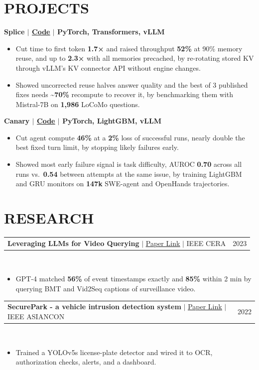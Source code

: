 \documentclass[10pt,letterpaper]{article}
\makeatletter
\newcommand{\link}[2]{\href{#1}{\textcolor{linkblue}{\underline{#2}}}}
\newcommand{\paper}[4]{%
  \begin{tabularx}{\textwidth}{@{}X r@{}}\textbf{#1} $|$ \link{#4}{Paper Link} $|$ #3 & #2\end{tabularx}\\[-1pt]}
\makeatother
\begin{document}
\section{PROJECTS}
\vspace{1.4pt}
\textbf{Splice $|$ \link{https://github.com/moriowen/splice}{Code} $|$ PyTorch, Transformers, vLLM}
\begin{itemize}
  \item Cut time to first token \textbf{1.7×} and raised throughput \textbf{52\%} at 90\% memory reuse, and up to \textbf{2.3×} with all memories precached, by re-rotating stored KV through vLLM's KV connector API without engine changes.
  \item Showed uncorrected reuse halves answer quality and the best of 3 published fixes needs \textbf{\textasciitilde70\%} recompute to recover it, by benchmarking them with Mistral-7B on \textbf{1,986} LoCoMo questions.
\end{itemize}
\vspace{4pt}
\textbf{Canary $|$ \link{https://github.com/moriowen/canary}{Code} $|$ PyTorch, LightGBM, vLLM}
\begin{itemize}
  \item Cut agent compute \textbf{46\%} at a \textbf{2\%} loss of successful runs, nearly double the best fixed turn limit, by stopping likely failures early.
  \item Showed most early failure signal is task difficulty, AUROC \textbf{0.70} across all runs vs.\ \textbf{0.54} between attempts at the same issue, by training LightGBM and GRU monitors on \textbf{147k} SWE-agent and OpenHands trajectories.
\end{itemize}

\section{RESEARCH}
\vspace{0.6pt}
\paper{Leveraging LLMs for Video Querying}{2023}
  {IEEE CERA}
  {https://ieeexplore.ieee.org/document/10455658}
\begin{itemize}
  \item GPT-4 matched \textbf{56\%} of event timestamps exactly and \textbf{85\%} within 2 min by querying BMT and Vid2Seq captions of surveillance video.
\end{itemize}
\vspace{4.2pt}
\paper{SecurePark - a vehicle intrusion detection system}{2022}
  {IEEE ASIANCON}
  {https://ieeexplore.ieee.org/abstract/document/9544923}
\begin{itemize}
  \item Trained a YOLOv5s license-plate detector and wired it to OCR, authorization checks, alerts, and a dashboard.
\end{itemize}
\end{document}
